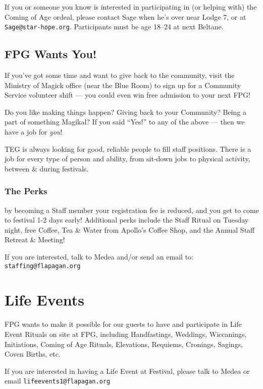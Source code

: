 \documentclass[9pt,twoside,openright,final,article,letterpaper]{memoir}
\let\oldsection=\section
\renewcommand{\section}[1]{%
  \nopagebreak
  \vspace{6pt} %
  \needspace{1.5in}
  \oldsection{#1}
  \nopagebreak}
\let\oldsubsection=\subsection
\renewcommand{\subsection}[1]{%
  \vspace{6pt}
  \needspace{1.25in}
  \oldsubsection{#1}
  \nopagebreak}
\let\oldsubsubsection=\subsubsection
\renewcommand{\subsubsection}[1]{%
  \needspace{.75in}
  \oldsubsubsection{#1}
  \nopagebreak}
\begin{document}
\begin{multicols}{2}
  \vspace{6pt}

  {\small If you or someone you know is interested in participating in
    (or helping with) the Coming of Age ordeal, please contact Sage
    when he's over near Lodge 7, or at
    \texttt{Sage@star-hope.org}. Participants must be age 18--24 at
    next Beltane.}

  \subsection{FPG Wants You!}

  If you've got some time and want to give back to the community, visit
  the Ministry of Magick office (near the Blue Room) to sign up for a
  Community Service volunteer shift --- you could even win free
  admission to your next FPG!

  Do you like making things happen? Giving back to your Community?
  Being a part of something Magikal? If you said ``Yes!'' to any of
  the above --- then we have a job for \emph{you}!

  TEG is always looking for good, reliable people to fill staff
  positions. There is a job for every type of person and ability, from
  sit-down jobs to physical activity, between \& during festivals.

  \subsubsection{The Perks} by becoming a Staff member your
  registration fee is reduced, and you get to come to festival 1-2
  days early! Additional perks include the Staff Ritual on Tuesday
  night, free Coffee, Tea \& Water from Apollo’s Coffee Shop, and the
  Annual Staff Retreat \& Meeting!

  If you are interested, talk to Medea and/or send an email to:
  \texttt{staffing@flapagan.org}
  \section{Life Events}


  FPG wants to make it possible for our guests to have and participate
  in Life Event Rituals on site at FPG, including Handfastings,
  Weddings, Wiccanings, Initiations, Coming of Age Rituals, Elevations,
  Requiems, Cronings, Sagings, Coven Births, etc.

  \vspace{6pt}

  If you are interested in having a Life Event at Festival, please talk
  to Medea or email \texttt{lifeevents1@flapagan.org}



\end{multicols}
\end{document}
